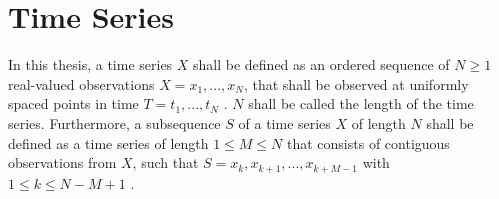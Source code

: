 \section{Time Series}
In this thesis, a time series $X$ shall be defined as an ordered sequence of $N \geq 1$ real-valued observations $X = x_1, ..., x_N$, that shall be observed at uniformly spaced points in time $T = t_1, ..., t_N$ \cite{Survey_Esling}. $N$ shall be called the length of the time series. \newline
Furthermore, a subsequence $S$ of a time series $X$ of length $N$ shall be defined as a time series of length $1 \leq M \leq N$ that consists of contiguous observations from $X$, such that $S = x_k, x_{k+1}, ..., x_{k+M-1}$ with $1 \leq k \leq N-M+1$ \cite{Survey_Esling}.
